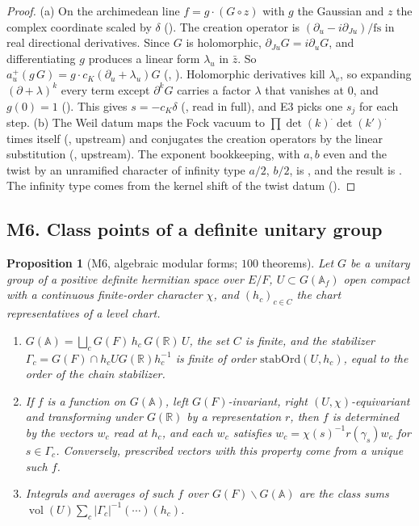 \documentclass[11pt]{article}
\newcommand{\A}{\mathbb A}
\newcommand{\Af}{\mathbb A_f}
\newcommand{\vol}{\operatorname{vol}}
\newtheorem{proposition}[theorem]{Proposition}
\theoremstyle{remark}
\begin{document}
\begin{proof}
(a) On the archimedean line $f=g\cdot(G\circ z)$ with $g$ the Gaussian and $z$ the complex coordinate scaled by $\delta$ (). The creation operator is $(\partial_u-i\partial_{Ju})/\mathrm{fs}$ in real directional derivatives. Since $G$ is holomorphic, $\partial_{Ju}G=i\partial_uG$, and differentiating $g$ produces a linear form $\lambda_u$ in $\bar z$. So $a^+_u(g\,G)=g\cdot c_K(\partial_u+\lambda_u)G$ (, ). Holomorphic derivatives kill $\lambda_v$, so expanding $(\partial+\lambda)^k$ every term except $\partial^kG$ carries a factor $\lambda$ that vanishes at $0$, and $g(0)=1$ (). This gives $s=-c_K\delta$ (, read in full), and E3 picks one $s_j$ for each step. (b) The Weil datum maps the Fock vacuum to $\prod\det(k)^{\cdot}\det(k')^{\cdot}$ times itself (, upstream) and conjugates the creation operators by the linear substitution (, upstream). The exponent bookkeeping, with $a,b$ even and the twist by an unramified character of infinity type $a/2$, $b/2$, is , and the result is . The infinity type comes from the kernel shift of the twist datum ().
\end{proof}

\subsection{M6. Class points of a definite unitary group}

\begin{proposition}[M6, algebraic modular forms; $100$ theorems]\label{prop:M6}
Let $G$ be a unitary group of a positive definite hermitian space over $E/F$, $U\subset G(\Af)$ open compact with a continuous finite-order character $\chi$, and $(h_c)_{c\in C}$ the chart representatives of a level chart.
\begin{enumerate}[label=(\alph*),itemsep=1pt]
\item $G(\A)=\bigsqcup_cG(F)\,h_c\,G(\mathbb R)\,U$, the set $C$ is finite, and the stabilizer $\Gamma_c=G(F)\cap h_cUG(\mathbb R)h_c^{-1}$ is finite of order $\mathrm{stabOrd}(U,h_c)$, equal to the order of the chain stabilizer.
\item If $f$ is a function on $G(\A)$, left $G(F)$-invariant, right $(U,\chi)$-equivariant and transforming under $G(\mathbb R)$ by a representation $r$, then $f$ is determined by the vectors $w_c$ read at $h_c$, and each $w_c$ satisfies $w_c=\chi(s)^{-1}r(\gamma_s)w_c$ for $s\in\Gamma_c$. Conversely, prescribed vectors with this property come from a unique such $f$.
\item Integrals and averages of such $f$ over $G(F)\backslash G(\A)$ are the class sums $\vol(U)\sum_c\lvert\Gamma_c\rvert^{-1}(\cdots)(h_c)$.
\end{enumerate}
\end{proposition}
\end{document}
